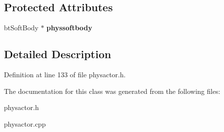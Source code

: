 \subsection*{Protected Attributes}
\begin{DoxyCompactItemize}
\item 
\hypertarget{classActorDynSoft_a59e1b9ae866bfd9af4bc2eebaf11a2d9}{
btSoftBody $\ast$ {\bfseries physsoftbody}}
\label{dc/de0/classActorDynSoft_a59e1b9ae866bfd9af4bc2eebaf11a2d9}

\end{DoxyCompactItemize}


\subsection{Detailed Description}


Definition at line 133 of file physactor.h.

The documentation for this class was generated from the following files:\begin{DoxyCompactItemize}
\item 
physactor.h\item 
physactor.cpp\end{DoxyCompactItemize}
